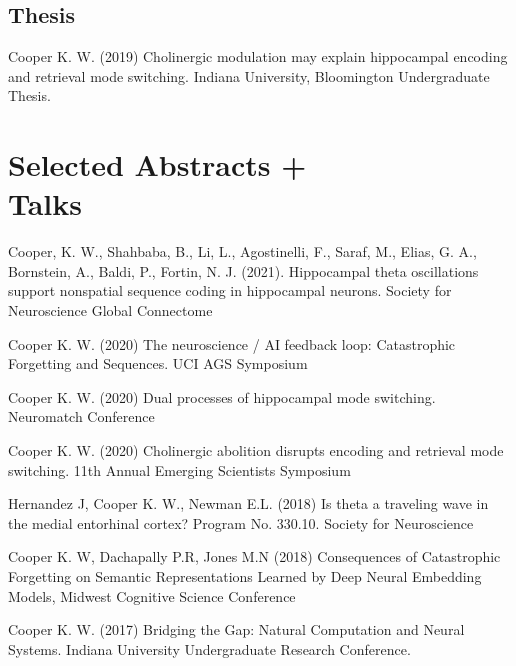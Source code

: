 \documentclass[10pt]{cooperCV2}
\begin{document}
\vspace{0.1in}
\subsection{Thesis} 

\begin{etaremune}[resume,  itemindent=-\bibhang, topsep=0pt,
				   itemsep=\bibsep,partopsep=0pt,parsep=0pt,leftmargin={\bibhang+\widthof{[999]}}] 
    \item Cooper K. W. (2019) Cholinergic modulation may explain hippocampal encoding and retrieval mode switching. Indiana University, Bloomington Undergraduate Thesis. 

\end{etaremune}


\section{Selected Abstracts +  \\Talks}

\begin{etaremune}[itemindent=-\bibhang, topsep=0pt,
				   itemsep=\bibsep,partopsep=0pt,parsep=0pt,leftmargin={\bibhang+\widthof{[999]}}] 
    \item  Cooper, K. W., Shahbaba, B., Li, L., Agostinelli, F., Saraf, M., Elias, G. A., Bornstein, A., Baldi, P.,  Fortin, N. J. (2021). Hippocampal theta oscillations support nonspatial sequence coding in hippocampal neurons. Society for Neuroscience Global Connectome


    \item  Cooper K. W. (2020) The neuroscience / AI feedback loop: Catastrophic Forgetting and Sequences. UCI AGS Symposium


    \item Cooper K. W. (2020) Dual processes of hippocampal mode switching. Neuromatch Conference

    \item Cooper K. W. (2020) Cholinergic abolition disrupts encoding and retrieval mode switching. 11th Annual Emerging Scientists Symposium

    \item Hernandez J, Cooper K. W., Newman E.L. (2018) Is theta a traveling wave in the medial entorhinal cortex? Program No. 330.10. Society for Neuroscience

    \item Cooper K. W, Dachapally P.R, Jones M.N (2018) Consequences of Catastrophic Forgetting on Semantic Representations Learned by Deep Neural Embedding Models, Midwest Cognitive Science Conference

    \item Cooper K. W. (2017) Bridging the Gap: Natural Computation and Neural Systems. Indiana University Undergraduate Research Conference.

\end{etaremune}
\end{document}
